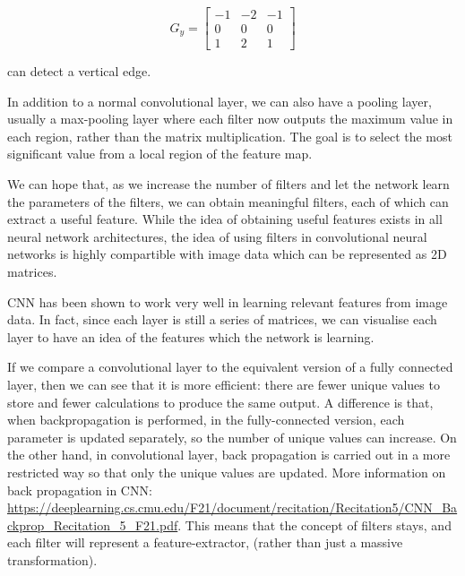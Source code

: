\documentclass[12pt]{article}
\begin{document}
\[
G_y = \begin{bmatrix}
-1 & -2 & -1 \\
0 & 0 & 0 \\
1 & 2 & 1
\end{bmatrix}
\]

can detect a vertical edge.


In addition to a normal convolutional layer, we can also have a pooling layer, usually a max-pooling layer where each filter now outputs the maximum value in each region, 
rather than the matrix multiplication. The goal is to select the most significant value from a local region of the feature map.


We can hope that, as we increase the number of filters and let the network learn the parameters of the filters, we can obtain meaningful filters, each of which can extract a useful feature. While the idea of obtaining useful features exists in all neural network architectures, the idea of using filters in convolutional neural networks is highly compartible with image data which can be represented as 2D matrices.

CNN has been shown to work very well in learning relevant features from image data. In fact, since each layer is still a series of matrices, we can visualise each layer to have an idea of the features which the network is learning.

If we compare a convolutional layer to the equivalent version of a fully connected layer, then we can see that it is more efficient: there are fewer unique values to store and fewer calculations to produce the same output. A difference is that, when backpropagation is performed, in the fully-connected version, each parameter is updated separately, so the number of unique values can increase. On the other hand, in convolutional layer, back propagation is carried out in a more restricted way so that only the unique values are updated. More information on back propagation in CNN: \url{https://deeplearning.cs.cmu.edu/F21/document/recitation/Recitation5/CNN_Backprop_Recitation_5_F21.pdf}. This means that the concept of filters stays, and each filter will represent a feature-extractor, (rather than just a massive transformation). 
\end{document}
